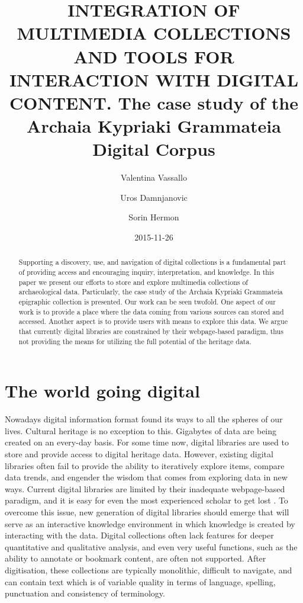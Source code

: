 \documentclass[amsthm,ebook]{saparticle}
\title{INTEGRATION OF MULTIMEDIA COLLECTIONS AND TOOLS FOR INTERACTION WITH DIGITAL CONTENT.
The case study of the Archaia Kypriaki Grammateia Digital Corpus}
\author[cyi]{Valentina Vassallo\corref{first}}
\author[cyi]{Uros Damnjanovic}
\author[cyi]{Sorin Hermon}
\date{2015-11-26}
\begin{document}
\maketitle
\begin{abstract}
Supporting a discovery, use, and navigation of digital collections is a fundamental part of providing access and
encouraging inquiry, interpretation, and knowledge. In this paper we present our efforts to store and explore
multimedia collections of archaeological data. Particularly, the case study of the Archaia Kypriaki Grammateia
epigraphic collection is presented. Our work can be seen twofold. One aspect of our work is to provide a place where
the data coming from various sources can stored and accessed. Another aspect is to provide users with means to explore
this data. We argue that currently digital libraries are constrained by their webpage-based paradigm, thus not
providing the means for utilizing the full potential of the heritage data.
\end{abstract}

\section{The world going digital}


\noindent Nowadays digital information format found its ways to all the spheres of our lives. Cultural heritage is no exception to
this. Gigabytes of data are being created on an every-day basis. For some time now, digital libraries are used to store
and provide access to digital heritage data. However, existing digital libraries often fail to provide the ability to
iteratively explore items, compare data trends, and engender the wisdom that comes from exploring data in new ways.
Current digital libraries are limited by their inadequate webpage-based paradigm, and it is easy for even the most
experienced scholar to get lost \citep{augmenting_2009}.
To overcome this issue, new generation of digital
libraries should emerge that will serve as an interactive knowledge environment in which knowledge is created by
interacting with the data. Digital collections often lack features for deeper quantitative and qualitative analysis,
and even very useful functions, such as the ability to annotate or bookmark content, are often not supported. After
digitisation, these collections are typically monolithic, difficult to navigate, and can contain text which is of
variable quality in terms of language, spelling, punctuation and consistency of terminology. 
\end{document}
